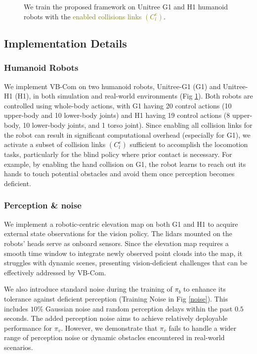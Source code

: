  

\begin{figure}[htbp]
\caption{We train the proposed framework on Unitree G1 and H1 humanoid robots with the \textcolor{olive}{enabled collisions links $(C_l^e)$}.}
\label{robot}
\end{figure}
\subsection{Implementation Details}

\subsubsection{Humanoid Robots}
We implement VB-Com on two humanoid robots, Unitree-G1 (G1) and Unitree-H1 (H1), in both simulation and real-world environments (Fig \ref{robot}). Both robots are controlled using whole-body actions, with G1 having 20 control actions (10 upper-body and 10 lower-body joints) and H1 having 19 control actions (8 upper-body, 10 lower-body joints, and 1 torso joint). Since enabling all collision links for the robot can result in significant computational overhead (especially for G1), we activate a subset of collision links $(C_l^e)$ sufficient to accomplish the locomotion tasks, particularly for the blind policy where prior contact is necessary. For example, by enabling the hand collision on G1, the robot learns to reach out its hands to touch potential obstacles and avoid them once perception becomes deficient.

\subsubsection{Perception \& noise}
We implement a robotic-centric elevation map on both G1 and H1 to acquire external state observations for the vision policy. The lidars mounted on the robots' heads serve as onboard sensors. Since the elevation map requires a smooth time window to integrate newly observed point clouds into the map, it struggles with dynamic scenes, presenting vision-deficient challenges that can be effectively addressed by VB-Com.

We also introduce standard noise during the training of $\pi_b$ to enhance its tolerance against deficient perception (Training Noise in Fig \ref{noise}). This includes $10\%$ Gaussian noise and random perception delays within the past $0.5$ seconds. The added perception noise aims to achieve relatively deployable performance for $\pi_v$. However, we demonstrate that $\pi_v$ fails to handle a wider range of perception noise or dynamic obstacles encountered in real-world scenarios.



